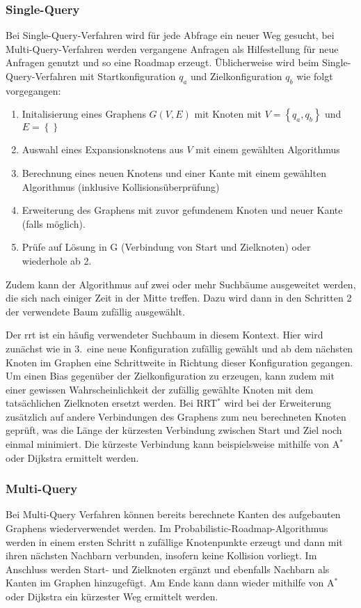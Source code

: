 \subsubsection{Single-Query}

Bei Single-Query-Verfahren wird für jede Abfrage ein neuer Weg gesucht, bei Multi-Query-Verfahren werden vergangene Anfragen als Hilfestellung für neue Anfragen genutzt und so eine Roadmap erzeugt.
Üblicherweise wird beim Single-Query-Verfahren mit Startkonfiguration $q_a$ und Zielkonfiguration $q_b$ wie folgt vorgegangen:
\begin{enumerate}
    \item Initalisierung eines Graphens $G(V, E)$ mit Knoten mit $V=\left\{ q_a, q_b \right\}$ und $E=\left\{  \right\}$
    \item Auswahl eines Expansionsknotens aus $V$ mit einem gewählten Algorithmus
    \item Berechnung eines neuen Knotens und einer Kante mit einem gewählten Algorithmus (inklusive Kollisionsüberprüfung)
    \item Erweiterung des Graphens mit zuvor gefundenem Knoten und neuer Kante (falls möglich).
    \item Prüfe auf Lösung in G (Verbindung von Start und Zielknoten) oder wiederhole ab 2.
\end{enumerate}

Zudem kann der Algorithmus auf zwei oder mehr Suchbäume ausgeweitet werden, die sich nach einiger Zeit in der Mitte treffen.
Dazu wird dann in den Schritten 2 der verwendete Baum zufällig ausgewählt.

Der \ac{rrt} ist ein häufig verwendeter Suchbaum in diesem Kontext.
Hier wird zunächst wie in 3.\ eine neue Konfiguration zufällig gewählt und ab dem nächsten Knoten im Graphen eine Schrittweite in Richtung dieser Konfiguration gegangen.
Um einen Bias gegenüber der Zielkonfiguration zu erzeugen, kann zudem mit einer gewissen Wahrscheinlichkeit der zufällig gewählte Knoten mit dem tatsächlichen Zielknoten ersetzt werden.
Bei RRT$^*$ wird bei der Erweiterung zusätzlich auf andere Verbindungen des Graphens zum neu berechneten Knoten geprüft, was die Länge der kürzesten Verbindung zwischen Start und Ziel noch einmal minimiert.
Die kürzeste Verbindung kann beispielsweise mithilfe von A$^*$ oder Dijkstra ermittelt werden.

\subsubsection{Multi-Query}
Bei Multi-Query Verfahren können bereits berechnete Kanten des aufgebauten Graphens wiederverwendet werden.
Im Probabilistic-Roadmap-Algorithmus werden in einem ersten Schritt n zufällige Knotenpunkte erzeugt und dann mit ihren nächsten Nachbarn verbunden, insofern keine Kollision vorliegt.
Im Anschluss werden Start- und Zielknoten ergänzt und ebenfalls Nachbarn als Kanten im Graphen hinzugefügt.
Am Ende kann dann wieder mithilfe von A$^*$ oder Dijkstra ein kürzester Weg ermittelt werden.


